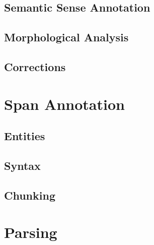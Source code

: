 \documentclass[a4paper,12pt]{article}
\begin{document}
\subsection{Semantic Sense Annotation}




\subsection{Morphological Analysis}


\subsection{Corrections}


\section{Span Annotation}

\subsection{Entities}

\subsection{Syntax}

\subsection{Chunking}





\section{Parsing}
\end{document}
